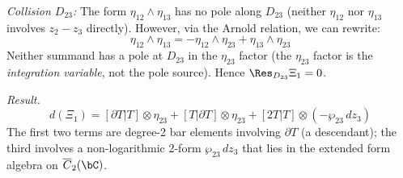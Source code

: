 \begin{computation}
\emph{Collision $D_{23}$:}
The form $\eta_{12} \wedge \eta_{13}$ has no pole along $D_{23}$
(neither $\eta_{12}$ nor $\eta_{13}$ involves $z_2 - z_3$ directly).
However, via the Arnold relation, we can rewrite:
\[
\eta_{12} \wedge \eta_{13}
= -\eta_{12} \wedge \eta_{23} + \eta_{13} \wedge \eta_{23}
\]
Neither summand has a pole at $D_{23}$ in the $\eta_{23}$ factor
(the $\eta_{23}$ factor is the \emph{integration variable},
not the pole source).  Hence $\Res_{D_{23}}\Xi_1 = 0$.

\emph{Result.}
\begin{equation}\label{eq:w3-dxi1}
d(\Xi_1) = [\partial T|T] \otimes \eta_{23}
+ [T|\partial T] \otimes \eta_{23}
+ [2T|T] \otimes (-\wp_{23}\,dz_3)
\end{equation}
The first two terms are degree-2 bar elements involving $\partial T$
(a descendant); the third involves a non-logarithmic 2-form
$\wp_{23}\,dz_3$ that lies in the extended form algebra
on $\overline{C}_2(\bC)$.
\end{computation}

